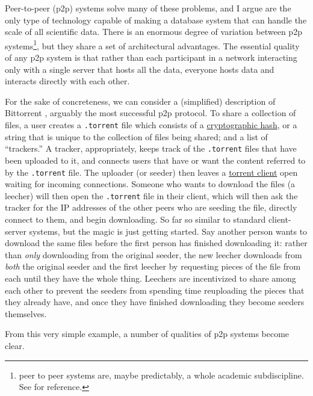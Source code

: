 \documentclass[notoc]{tufte-book}
\begin{document}
Peer-to-peer (p2p) systems solve many of these problems, and I argue are
the only type of technology capable of making a database system that can
handle the scale of all scientific data. There is an enormous degree of
variation between p2p systems\footnote{peer to peer systems are, maybe
  predictably, a whole academic subdiscipline. See \citep{shenHandbookPeertoPeerNetworking2010}  for reference.}, but they
share a set of architectural advantages. The essential quality of any
p2p system is that rather than each participant in a network interacting
only with a single server that hosts all the data, everyone hosts data
and interacts directly with each other.

For the sake of concreteness, we can consider a (simplified) description
of Bittorrent \citep{cohenBitTorrentProtocolSpecification2017} ,
arguably the most successful p2p protocol. To share a collection of
files, a user creates a \texttt{.torrent} file which consists of a
\href{https://en.wikipedia.org/wiki/Cryptographic_hash_function}{cryptographic
hash}, or a string that is unique to the collection of files being
shared; and a list of ``trackers.'' A tracker, appropriately, keeps
track of the \texttt{.torrent} files that have been uploaded to it, and
connects users that have or want the content referred to by the
\texttt{.torrent} file. The uploader (or seeder) then leaves a
\href{https://en.wikipedia.org/wiki/Glossary_of_BitTorrent_terms\#Client}{torrent
client} open waiting for incoming connections. Someone who wants to
download the files (a leecher) will then open the \texttt{.torrent} file
in their client, which will then ask the tracker for the IP addresses of
the other peers who are seeding the file, directly connect to them, and
begin downloading. So far so similar to standard client-server systems,
but the magic is just getting started. Say another person wants to
download the same files before the first person has finished downloading
it: rather than \emph{only} downloading from the original seeder, the
new leecher downloads from \emph{both} the original seeder and the first
leecher by requesting pieces of the file from each until they have the
whole thing. Leechers are incentivized to share among each other to
prevent the seeders from spending time reuploading the pieces that they
already have, and once they have finished downloading they become
seeders themselves.

From this very simple example, a number of qualities of p2p systems
become clear.
\end{document}
